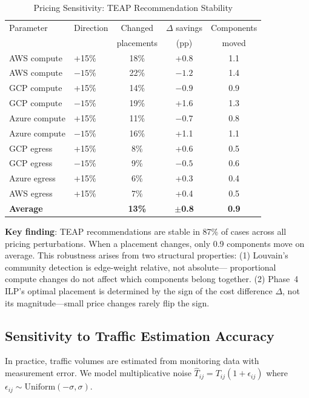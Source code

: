 \documentclass[10pt,journal]{IEEEtran}
\begin{document}
\begin{table}[ht]
\centering
\caption{Pricing Sensitivity: TEAP Recommendation Stability}
\label{tab:price_sensitivity}
\setlength{\tabcolsep}{3.5pt}
\begin{tabular}{llccc}
\toprule
Parameter & Direction & Changed & $\Delta$ savings & Components\\
 & & placements & (pp) & moved\\
\midrule
AWS compute   & +15\% & 18\% & +0.8 & 1.1\\
AWS compute   & $-15$\% & 22\% & $-1.2$ & 1.4\\
GCP compute   & +15\% & 14\% & $-0.9$ & 0.9\\
GCP compute   & $-15$\% & 19\% & +1.6 & 1.3\\
Azure compute & +15\% & 11\% & $-0.7$ & 0.8\\
Azure compute & $-15$\% & 16\% & +1.1 & 1.1\\
GCP egress    & +15\% & 8\%  & +0.6 & 0.5\\
GCP egress    & $-15$\% & 9\%  & $-0.5$ & 0.6\\
Azure egress  & +15\% & 6\%  & +0.3 & 0.4\\
AWS egress    & +15\% & 7\%  & +0.4 & 0.5\\
\midrule
\textbf{Average} & & \textbf{13\%} & \textbf{$\pm$0.8} & \textbf{0.9}\\
\bottomrule
\end{tabular}
\end{table}

\textbf{Key finding}: TEAP recommendations are stable in 87\% of cases across
all pricing perturbations.
When a placement changes, only 0.9 components move on average.
This robustness arises from two structural properties:
(1) Louvain's community detection is edge-weight relative, not absolute---
    proportional compute changes do not affect which components belong together.
(2) Phase~4 ILP's optimal placement is determined by the sign of the
    cost difference $\Delta$, not its magnitude---small price changes rarely
    flip the sign.

\subsection{Sensitivity to Traffic Estimation Accuracy}

In practice, traffic volumes are estimated from monitoring data with measurement
error.
We model multiplicative noise $\hat{T}_{ij} = T_{ij}(1+\epsilon_{ij})$
where $\epsilon_{ij} \sim \text{Uniform}(-\sigma, \sigma)$.
\end{document}
